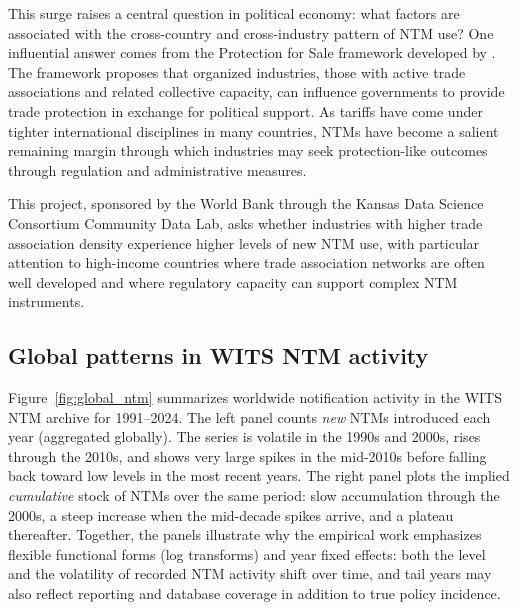 \documentclass[12pt,letterpaper]{article}
\begin{document}
This surge raises a central question in political economy: what factors are associated with the cross-country and cross-industry pattern of NTM use? One influential answer comes from the Protection for Sale framework developed by \citet{grossmanHelpman1994}. The framework proposes that organized industries, those with active trade associations and related collective capacity, can influence governments to provide trade protection in exchange for political support. As tariffs have come under tighter international disciplines in many countries, NTMs have become a salient remaining margin through which industries may seek protection-like outcomes through regulation and administrative measures.

This project, sponsored by the World Bank through the Kansas Data Science Consortium Community Data Lab, asks whether industries with higher trade association density experience higher levels of new NTM use, with particular attention to high-income countries where trade association networks are often well developed and where regulatory capacity can support complex NTM instruments.

\subsection{Global patterns in WITS NTM activity}

Figure~\ref{fig:global_ntm} summarizes worldwide notification activity in the WITS NTM archive for 1991--2024. The left panel counts \emph{new} NTMs introduced each year (aggregated globally). The series is volatile in the 1990s and 2000s, rises through the 2010s, and shows very large spikes in the mid-2010s before falling back toward low levels in the most recent years. The right panel plots the implied \emph{cumulative} stock of NTMs over the same period: slow accumulation through the 2000s, a steep increase when the mid-decade spikes arrive, and a plateau thereafter. Together, the panels illustrate why the empirical work emphasizes flexible functional forms (log transforms) and year fixed effects: both the level and the volatility of recorded NTM activity shift over time, and tail years may also reflect reporting and database coverage in addition to true policy incidence.
\end{document}
